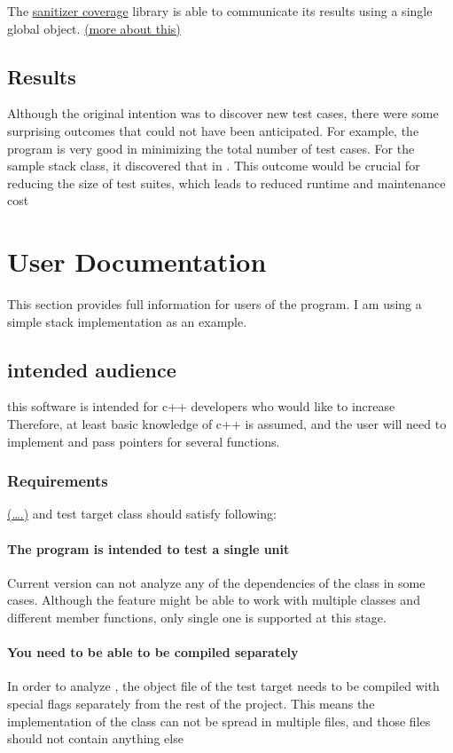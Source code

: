 \documentclass{elteikthesis}[2018/06/06]
\begin{document}
The \uline{sanitizer coverage} library is able to communicate its results using a single global object. \uline{(more about this)}  \\
\section{Results}
\label{sec-1-4}
Although the original intention was to discover new test cases, there were some surprising outcomes that could not have been anticipated. For example, the program is very good in minimizing the total number of test cases. For the sample stack class, it discovered that in . This outcome would be crucial for reducing the size of test suites, which leads to reduced runtime and maintenance cost \\
\chapter{User Documentation}
\label{sec-2}
This section provides full information for users of the program. I am using a simple stack implementation as an example. \\

\section{intended audience}
\label{sec-2-1}
this software is intended for c++ developers who would like to increase \\
Therefore, at least basic knowledge of c++ is assumed, and the user will need to implement and pass pointers for several functions. \\
\subsection{Requirements}
\label{sec-2-1-1}
\uline{(\ldots{}.)} and test target class should satisfy following: \\
\subsubsection{The program is intended to test a single unit}
\label{sec-2-1-1-1}
Current version can not analyze any of the dependencies of the class in some cases. Although the feature might be able to work with multiple classes and different member functions, only single one is supported at this stage. \\
\subsubsection{You need to be able to be compiled separately}
\label{sec-2-1-1-2}
In order to analyze , the object file of the test target needs to be compiled with special flags separately from the rest of the project. This means the implementation of the class can not be spread in multiple files, and those files should not contain anything else \\
\end{document}
